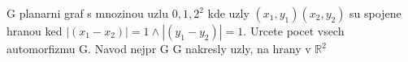 G planarni graf s mnozinou uzlu ${0,1,2}^2$ kde uzly $(x_1, y_1)
(x_2, y_2)$ su spojene hranou ked $|(x_1 - x_2)| = 1 \land |(y_1 -
y_2)| = 1$. Urcete pocet vsech automorfizmu G. Navod nejpr G G nakresly
uzly, na hrany v $\mathbb{R}^{2}$
